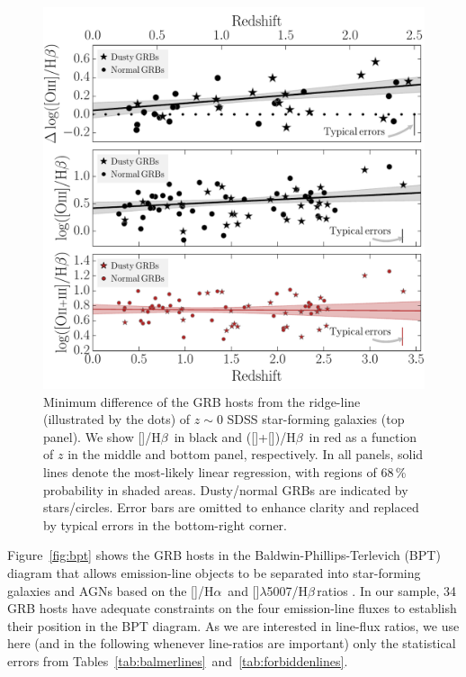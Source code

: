 \documentclass[traditabstract, longauth]{aa}
\newcommand{\hb}{H$\beta$}
\newcommand{\ha}{H$\alpha$}
\newcommand{\oii}{[\ion{O}{ii}]}
\newcommand{\oiii}{[\ion{O}{iii}]}
\newcommand{\nii}{[\ion{N}{ii}]}
\begin{document}
\begin{figure}
\includegraphics[angle=0, width=0.99\columnwidth]{Figs/BPT_dist.pdf}
\caption{Minimum difference of the GRB hosts from the ridge-line (illustrated by the dots) of $z\sim0$ SDSS star-forming galaxies (top panel). We show \oiii/\hb\, in black and (\oiii+\oii)/\hb\, in red as a function of $z$ in the middle and bottom panel, respectively. In all panels, solid lines denote the most-likely linear regression, with regions of 68\,\% probability in shaded areas. Dusty/normal GRBs are indicated by stars/circles. Error bars are omitted to enhance clarity and replaced by typical errors in the bottom-right corner.}
\label{fig:bptdist}
\end{figure}

Figure~\ref{fig:bpt} shows the GRB hosts in the Baldwin-Phillips-Terlevich (BPT) diagram \citep{1981PASP...93....5B} that allows emission-line objects to be separated into star-forming galaxies and AGNs based on the \nii/\ha\, and \oiii$\lambda$5007/\hb\,ratios \citep[e.g.,][]{2001ApJ...556..121K}. In our sample, 34 GRB hosts have adequate constraints on the four emission-line fluxes to establish their position in the BPT diagram. As we are interested in line-flux ratios, we use here (and in the following whenever line-ratios are important) only the statistical errors from Tables~\ref{tab:balmerlines}~and~\ref{tab:forbiddenlines}.
\end{document}

